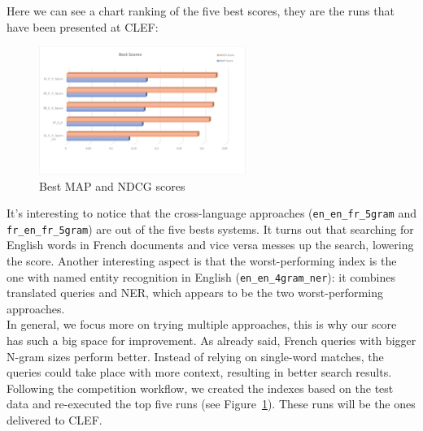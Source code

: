 Here we can see a chart ranking of the five best scores, they are the runs that have been presented at CLEF:
\begin{figure}[h!]
    \centering
    \includegraphics[width=0.6\textwidth]{figure/bestScores.png}
    \caption{Best MAP and NDCG scores}
    \label{fig:best_scores}
\end{figure}
It's interesting to notice that the cross-language approaches (\texttt{en\_en\_fr\_5gram} and \texttt{fr\_en\_fr\_5gram}) are out of the five bests systems.
It turns out that searching for English words in French documents and vice versa messes up the search, lowering the score.
Another interesting aspect is that the worst-performing index is the one with named entity recognition in English (\texttt{en\_en\_4gram\_ner}): it combines translated queries and NER, which appears to be the two worst-performing approaches.\\
In general, we focus more on trying multiple approaches, this is why our score has such a big space for improvement.
As already said, French queries with bigger N-gram sizes perform better.
Instead of relying on single-word matches, the queries could take place with more context, resulting in better search
results.\\

Following the competition workflow, we created the indexes based on the test data and re-executed the top five
runs (see Figure~\ref{fig:best_scores}). These runs will be the ones delivered to CLEF.

